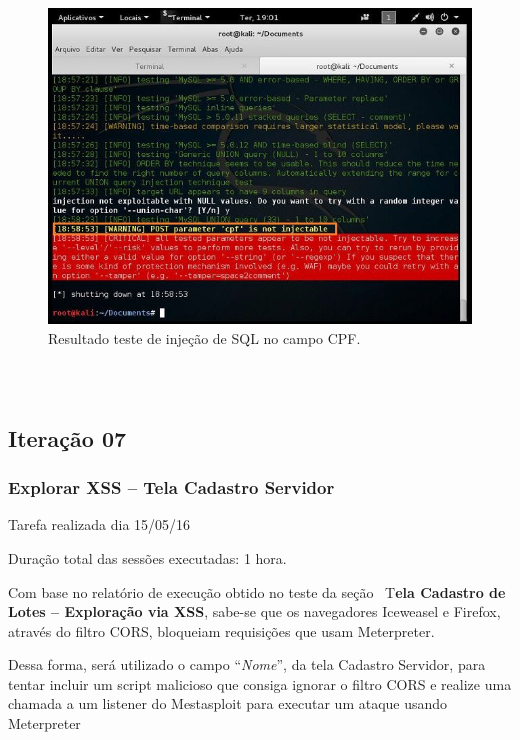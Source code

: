 \documentclass[
    12pt,               %
    openright,          %
    oneside,            %
    a4paper,            %
    section=TITLE,     %
    english,            %
    french,             %
    spanish,            %
    brazil              %
    ]{abntex2}
\begin{document}
\begin{figure}[htp]
\centering
\caption{Resultado teste de injeção de SQL no campo CPF.}
\includegraphics[width=450px]{image30.jpeg}
\end{figure}
\ifdefined\FloatBarrier \FloatBarrier \fi



\subsubsection*{~}


\subsection{Iteração 07}




\subsubsection*{Explorar XSS -- Tela Cadastro Servidor}

Tarefa realizada dia 15/05/16


Duração total das sessões executadas: 1 hora.


Com base no relatório de execução obtido no teste da seção ~T\textbf{ela Cadastro de Lotes -- Exploração via XSS}, sabe-se que os navegadores Iceweasel e Firefox, através do filtro CORS, bloqueiam requisições que usam Meterpreter.


Dessa forma, será utilizado o campo \textquotedblleft{}\emph{Nome}\textquotedblright{}, da tela Cadastro Servidor, para tentar incluir um script malicioso que consiga ignorar o filtro CORS e realize uma chamada a um listener do Mestasploit para executar um ataque usando Meterpreter
\end{document}
